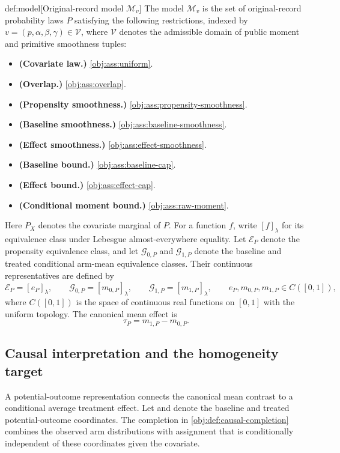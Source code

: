 \begin{definitionv}{def:model}[Original-record model \(\mathcal M_v\)]
The model \(\mathcal M_v\) is the set of original-record probability laws \(P\) satisfying the following restrictions, indexed by \(v=(p,\alpha,\beta,\gamma)\in\mathcal V\), where \(\mathcal V\) denotes the admissible domain of public moment and primitive smoothness tuples:
\begin{itemize}
\item \textbf{(Covariate law.)} \cref{obj:ass:uniform}.
\item \textbf{(Overlap.)} \cref{obj:ass:overlap}.
\item \textbf{(Propensity smoothness.)} \cref{obj:ass:propensity-smoothness}.
\item \textbf{(Baseline smoothness.)} \cref{obj:ass:baseline-smoothness}.
\item \textbf{(Effect smoothness.)} \cref{obj:ass:effect-smoothness}.
\item \textbf{(Baseline bound.)} \cref{obj:ass:baseline-cap}.
\item \textbf{(Effect bound.)} \cref{obj:ass:effect-cap}.
\item \textbf{(Conditional moment bound.)} \cref{obj:ass:raw-moment}.
\end{itemize}
Here \(P_X\) denotes the covariate marginal of \(P\). For a function \(f\), write \([f]_\lambda\) for its equivalence class under Lebesgue almost-everywhere equality. Let \(\mathcal E_P\) denote the propensity equivalence class, and let \(\mathcal G_{0,P}\) and \(\mathcal G_{1,P}\) denote the baseline and treated conditional arm-mean equivalence classes. Their continuous representatives are defined by
\[
\mathcal E_P=[e_P]_\lambda,\qquad
\mathcal G_{0,P}=[m_{0,P}]_\lambda,\qquad
\mathcal G_{1,P}=[m_{1,P}]_\lambda,
\qquad
e_P,m_{0,P},m_{1,P}\in C([0,1]),
\]
where \(C([0,1])\) is the space of continuous real functions on \([0,1]\) with the uniform topology. The canonical mean effect is
\[
\tau_P=m_{1,P}-m_{0,P}.
\]
\end{definitionv}

\subsection{Causal interpretation and the homogeneity target}

A potential-outcome representation connects the canonical mean contrast to a conditional average treatment effect. Let  and  denote the baseline and treated potential-outcome coordinates. The completion  in \cref{obj:def:causal-completion} combines the observed arm distributions with assignment that is conditionally independent of these coordinates given the covariate.

